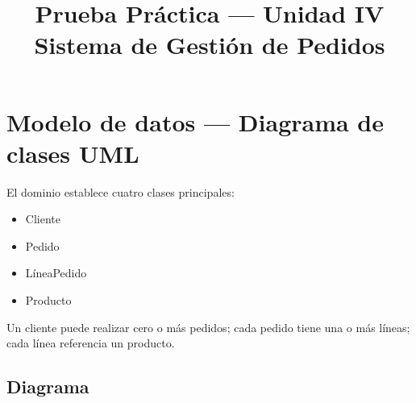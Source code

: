 \documentclass[12pt,a4paper]{article}
\title{\textbf{Prueba Práctica --- Unidad IV \\ Sistema de Gestión de Pedidos}}
\author{}
\date{}
\begin{document}
\maketitle
\vspace{-2em}

\section{Modelo de datos --- Diagrama de clases UML}

El dominio establece cuatro clases principales:

\begin{itemize}[nosep]
    \item Cliente
    \item Pedido
    \item LíneaPedido
    \item Producto
\end{itemize}

Un cliente puede realizar cero o más pedidos; cada pedido tiene una o más líneas; cada línea referencia un producto.

\subsection*{Diagrama}
\end{document}
